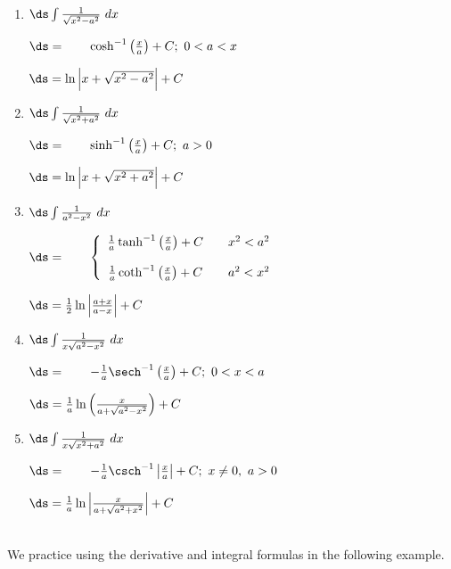 \setboxwidth{120pt}
\noindent%
\begin{minipage}{\specialboxlength}
{%
\begin{enumerate}
\item \parbox{70pt}{$\ds\int \frac{1}{\sqrt{x^2-a^2}}\ dx$} \parbox{180pt}{$\ds=\qquad \cosh^{-1}\left(\frac xa\right)+C;\ 0<a<x$} $\ds=\ln\Big|x+\sqrt{x^2-a^2}\Big|+C$

\item \parbox{70pt}{$\ds\int \frac{1}{\sqrt{x^2+a^2}}\ dx$} \parbox{180pt}{$\ds=\qquad \sinh^{-1}\left(\frac xa\right)+C;\ a>0$} $\ds=\ln\Big|x+\sqrt{x^2+a^2}\Big|+C$

\item \parbox{70pt}{$\ds\int \frac{1}{a^2-x^2}\ dx$} \parbox{180pt}{$\ds=\qquad \left\{\begin{array}{ccc} \frac1a\tanh^{-1}\left(\frac xa\right)+C & & x^2<a^2 \\ \\
\frac1a\coth^{-1}\left(\frac xa\right)+C & & a^2<x^2 \end{array}\right.$} $\ds=\frac12\ln\left|\frac{a+x}{a-x}\right|+C$

\item \parbox{70pt}{$\ds\int \frac{1}{x\sqrt{a^2-x^2}}\ dx $} \parbox{180pt}{$\ds=\qquad -\frac1a\sech^{-1}\left(\frac xa\right)+C;\ 0<x<a$} $\ds= \frac1a \ln\left(\frac{x}{a+\sqrt{a^2-x^2}}\right)+C $

\item	\parbox{70pt}{$\ds\int \frac{1}{x\sqrt{x^2+a^2}}\ dx $} \parbox{180pt}{$\ds=\qquad -\frac1a\csch^{-1}\left|\frac xa\right| + C;\ x\neq 0,\ a>0$}$\ds= \frac1a \ln\left|\frac{x}{a+\sqrt{a^2+x^2}}\right|+C $
\end{enumerate}
}
\end{minipage}
\restoreboxwidth
\\

We practice using the derivative and integral formulas in the following example.\\
\clearpage


